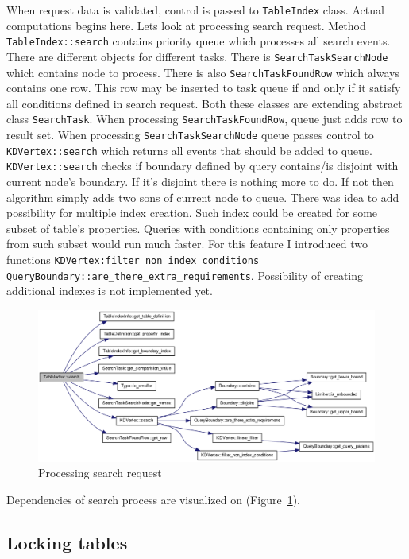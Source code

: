 \documentclass[10pt,a4paper]{article}
\begin{document}
When request data is validated, control is passed to \verb|TableIndex| class. Actual computations begins here. Lets look at processing search request. Method \verb|TableIndex::search| contains priority queue which processes all search events. There are different objects for different tasks. There is \verb|SearchTaskSearchNode| which contains node to process. There is also \verb|SearchTaskFoundRow| which always contains one row. This row may be inserted to task queue if and only if it satisfy all conditions defined in search request. Both these classes are extending abstract class \verb|SearchTask|. When processing \verb|SearchTaskFoundRow|, queue just adds row to result set. When processing \verb|SearchTaskSearchNode| queue passes control to \verb|KDVertex::search| which returns all events that should be added to queue. \verb|KDVertex::search| checks if boundary defined by query contains/is disjoint with current node's boundary. If it's disjoint there is nothing more to do. If not then algorithm simply adds two sons of current node to queue. There was idea to add possibility for multiple index creation. Such index could be created for some subset of table's properties. Queries with conditions containing only properties from such subset would run much faster. For this feature I introduced two functions \verb|KDVertex:filter_non_index_conditions| \verb|QueryBoundary::are_there_extra_requirements|. Possibility of creating additional indexes is not implemented yet.  

\begin{figure}
\centering
  \includegraphics[width=16cm]{search}
  \caption{Processing search request}
  \label{fig:search}
\end{figure}

Dependencies of search process are visualized on (Figure~\ref{fig:search}).

\subsection{Locking tables}
\end{document}

